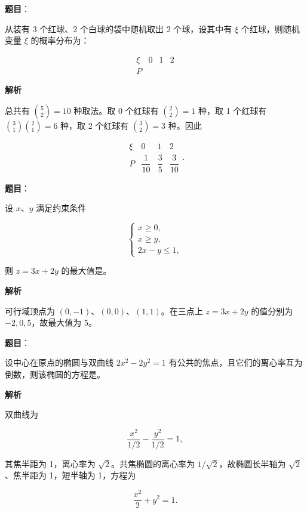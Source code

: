 \begin{answer}

\textbf{题目}：

从装有 3 个红球、2 个白球的袋中随机取出 2 个球，设其中有 $\xi$ 个红球，则随机变量 $\xi$ 的概率分布为：

\nopagebreak[4]
\[
\begin{array}{c|ccc}
\xi&0&1&2\\
\hline
P&&&
\end{array}
\]

\textbf{解析}

总共有 $\binom52=10$ 种取法。取 0 个红球有 $\binom22=1$ 种，取 1 个红球有 $\binom31\binom21=6$ 种，取 2 个红球有 $\binom32=3$ 种。因此

\nopagebreak[4]
\[
\begin{array}{c|ccc}
\xi&0&1&2\\
\hline
P&\dfrac1{10}&\dfrac35&\dfrac3{10}
\end{array}.
\]


\end{answer}
\begin{answer}

\textbf{题目}：

设 $x\text{、}y$ 满足约束条件

\nopagebreak[4]
\[
\begin{cases}
x\geqslant0,\\
x\geqslant y,\\
2x-y\leqslant1,
\end{cases}
\]

则 $z=3x+2y$ 的最大值是\gkblank{}。

\textbf{解析}

可行域顶点为 $(0,-1)$、$(0,0)$、$(1,1)$。在三点上 $z=3x+2y$ 的值分别为 $-2,0,5$，故最大值为 5。


\end{answer}
\begin{answer}

\textbf{题目}：

设中心在原点的椭圆与双曲线 $2x^2-2y^2=1$ 有公共的焦点，且它们的离心率互为倒数，则该椭圆的方程是\gkblank{}。

\textbf{解析}

双曲线为

\nopagebreak[4]
\[
\frac{x^2}{1/2}-\frac{y^2}{1/2}=1,
\]

其焦半距为 1，离心率为 $\sqrt2$。共焦椭圆的离心率为 $1/\sqrt2$，故椭圆长半轴为 $\sqrt2$、焦半距为 1，短半轴为 1，方程为

\nopagebreak[4]
\[
\frac{x^2}{2}+y^2=1.
\]


\end{answer}

